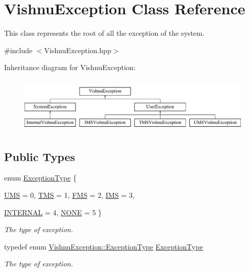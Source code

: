 \hypertarget{classVishnuException}{
\section{VishnuException Class Reference}
\label{classVishnuException}
}


This class represents the root of all the exception of the system.  




{\ttfamily \#include $<$VishnuException.hpp$>$}

Inheritance diagram for VishnuException:\begin{figure}[H]
\begin{center}
\leavevmode
\includegraphics[height=2.692308cm]{classVishnuException}
\end{center}
\end{figure}
\subsection*{Public Types}
\begin{DoxyCompactItemize}
\item 
enum \hyperlink{classVishnuException_ad9de1e07d1e54a454cd2f7f3883de001}{ExceptionType} \{ \par
\hyperlink{classVishnuException_ad9de1e07d1e54a454cd2f7f3883de001a75dfbd63efc45f759335784afc2a21df}{UMS} =  0, 
\hyperlink{classVishnuException_ad9de1e07d1e54a454cd2f7f3883de001a06dc1eee51aff5d00237e67ea4327035}{TMS} =  1, 
\hyperlink{classVishnuException_ad9de1e07d1e54a454cd2f7f3883de001a8bf79f006a7f499ff19a29f961e3b587}{FMS} =  2, 
\hyperlink{classVishnuException_ad9de1e07d1e54a454cd2f7f3883de001a1cad27b5570c824a1ed1dbe3cc2a23ed}{IMS} =  3, 
\par
\hyperlink{classVishnuException_ad9de1e07d1e54a454cd2f7f3883de001aa62f896d183527469a8281313eae4ea8}{INTERNAL} =  4, 
\hyperlink{classVishnuException_ad9de1e07d1e54a454cd2f7f3883de001aff77e716a0cf84478ddbd9b0f4737ce3}{NONE} =  5
 \}
\begin{DoxyCompactList}\small\item\em The type of exception. \item\end{DoxyCompactList}\item 
\hypertarget{classVishnuException_aba758c9545d4f417123ce27c512d8f31}{
typedef enum \hyperlink{classVishnuException_ad9de1e07d1e54a454cd2f7f3883de001}{VishnuException::ExceptionType} \hyperlink{classVishnuException_aba758c9545d4f417123ce27c512d8f31}{ExceptionType}}
\label{classVishnuException_aba758c9545d4f417123ce27c512d8f31}

\begin{DoxyCompactList}\small\item\em The type of exception. \item\end{DoxyCompactList}\end{DoxyCompactItemize}
